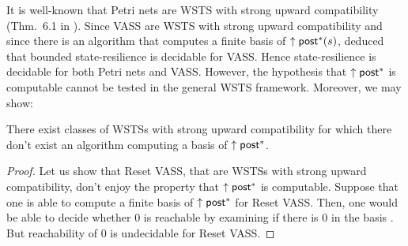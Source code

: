 \iffalse
\begin{proof}
By Proposition~\ref{post*}, a basis of $\uparrow \post^*(s)$ is computable for every state $s$ iff the downward-reachability problem is decidable.
Let us now show that the downward-reachability problem is decidable for Petri nets.
Let us consider a downward closed set $D$ in a Petri net.
Let us consider $B$ a basis of the upward closed set $S \setminus D$.

$D$ is  defined by ... states where your number of counter is bounded by a constant (deduce this from ... having to be smaller than elements of the basis $B$), and others where it is unbounded. You have $m$ counters where it is bounded by $n$
then you have $m \times n$ possibilities for the values in these counters
you have unlimited possibilities for the values of the other counters,
but that is where the submarking problem comes in handy,
i.e. you ask the submarking problem for all of the $m \times n$ possibilities.

So downward-set reachability is decidable for PN.
\end{proof}
\fi

It is well-known that Petri nets are WSTS with strong upward compatibility (Thm.~6.1 in \cite{DBLP:journals/tcs/FinkelS01}). 
Since VASS are WSTS with strong upward compatibility and since there is an algorithm that computes a finite basis of  $\uparrow \post^*(s)$, \cite{DBLP:conf/gg/Ozkan22} deduced that bounded state-resilience is decidable for VASS.
Hence state-resilience is decidable for both Petri nets and VASS.
However, the hypothesis that $\uparrow \textsf{post}^*$ is computable cannot be tested in the general WSTS framework. Moreover, we may show:

\begin{proposition}
There exist classes of WSTSs with strong upward compatibility for which there don't exist an algorithm computing a basis of $\uparrow \textsf{post}^*$.
\end{proposition}


\begin{proof}
Let us show that Reset VASS, that are WSTSs with strong upward compatibility, don't enjoy the property that $\uparrow \textsf{post}^*$ is computable.
Suppose that one is able to compute a finite basis of $\uparrow \textsf{post}^*$ for Reset VASS. Then, one would be able to decide whether $0$ is reachable 
by examining if there is %
$0$ in the basis%
. But reachability of $0$  %
is undecidable for Reset VASS. 
\end{proof}

